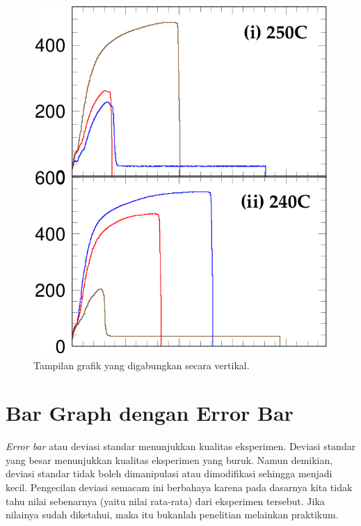 \begin{figure}[htbp]
\includegraphics[width=\textwidth]{gambar/grafikTumpuk.png}
\caption{Tampilan grafik yang digabungkan secara vertikal.}
\label{Fig:grafikTumpuk}
\end{figure}

\section{Bar Graph dengan Error Bar}
\textit{Error bar} atau deviasi standar menunjukkan kualitas eksperimen.
Deviasi standar yang besar menunjukkan kualitas eksperimen yang buruk.
Namun demikian, deviasi standar tidak boleh dimanipulasi atau dimodifikasi
sehingga menjadi kecil.  Pengecilan deviasi semacam ini berbahaya karena
pada dasarnya kita tidak tahu nilai sebenarnya (yaitu nilai rata-rata) dari
eksperimen tersebut. Jika nilainya sudah diketahui, maka itu bukanlah penelitian
melainkan praktikum.

